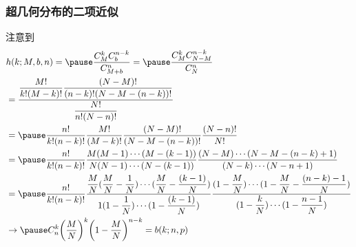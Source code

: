 \documentclass[Prob-All.tex]{subfiles}
\begin{document}
\begin{frame}
	\frametitle{超几何分布的二项近似}
	注意到
	{\small \begin{align*}
		 & h(k;M,b,n)=\pause \dfrac{C_M^kC_b^{n-k}}{C_{M+b}^n}=\pause \dfrac{C_M^kC_{N-M}^{n-k}}{C_{N}^n}                                                                                                                                                                                \\
		 & =\dfrac{\dfrac{M!}{k!(M-k)!}\dfrac{(N-M)!}{(n-k)!(N-M-(n-k))!}}{\dfrac{N!}{n!(N-n)!}}                                                                                                                                                                                         \\
		 & =\pause \dfrac{n!}{k!(n-k)!}\dfrac{M!}{(M-k)!}\dfrac{(N-M)!}{(N-M-(n-k))!}\dfrac{(N-n)!}{N!}                                                                                                                                                                                  \\
		 & =\pause \dfrac{n!}{k!(n-k)!}\dfrac{M(M-1)\cdots (M-(k-1))}{N(N-1)\cdots (N-(k-1))} \dfrac{(N-M)\cdots (N-M-(n-k)+1)}{(N-k)\cdots (N-n+1)}                                                                                                                                     \\
		 & =\pause \dfrac{n!}{k!(n-k)!}\dfrac{\dfrac{M}{N}(\dfrac{M}{N}-\dfrac{1}{N})\cdots (\dfrac{M}{N}-\dfrac{(k-1)}{N})}{1(1-\dfrac{1}{N})\cdots (1-\dfrac{(k-1)}{N})} \dfrac{(1-\dfrac{M}{N})\cdots (1-\dfrac{M}{N}-\dfrac{(n-k)-1}{N})}{(1-\dfrac{k}{N})\cdots (1-\dfrac{n-1}{N})} \\
		 & \rightarrow \pause C_n^k\bigg(\dfrac{M}{N}\bigg)^k\bigg(1-\dfrac{M}{N}\bigg)^{n-k}=b(k;n,p)
	\end{align*}
	}
\end{frame}
\end{document}
